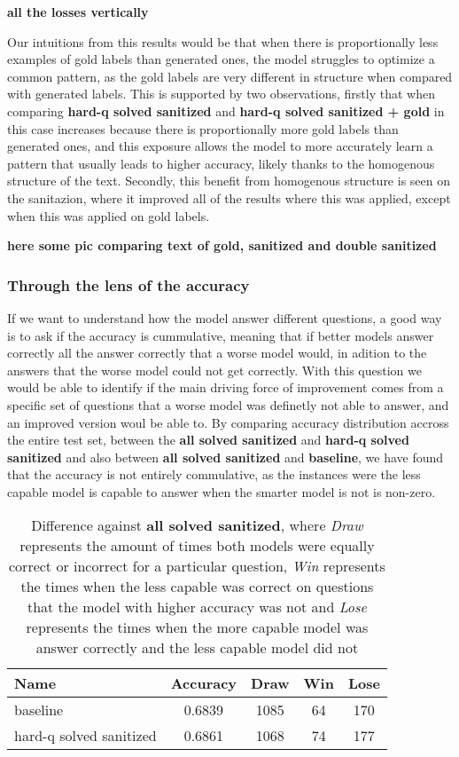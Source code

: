 \documentclass[a4paper,10pt]{article}
\begin{document}
\textbf{all the losses vertically}


Our intuitions from this results would be that when there is proportionally less examples of gold labels than generated ones, the model struggles to optimize a common pattern, as the gold labels are very different in structure when compared with generated labels. This is supported by two observations, firstly that when comparing \textbf{hard-q solved sanitized} and \textbf{hard-q solved sanitized + gold} in this case increases because there is proportionally more gold labels than generated ones, and this exposure allows the model to more accurately learn a pattern that usually leads to higher accuracy, likely thanks to the homogenous structure of the text. Secondly, this benefit from homogenous structure is seen on the sanitazion, where it improved all of the results where this was applied, except when this was applied on gold labels.

\textbf{here some pic comparing text of gold, sanitized and double sanitized}


\subsubsection{Through the lens of the accuracy}
If we want to understand how the model answer different questions, a good way is to ask if the accuracy is cummulative, meaning that if better models answer correctly all the answer correctly that a worse model would, in adition to the answers that the worse model could not get correctly. With this question we would be able to identify if the main driving force of improvement comes from a specific set of questions that a worse model was definetly not able to answer, and an improved version woul be able to. By comparing accuracy distribution accross the entire test set, between the \textbf{all solved sanitized} and \textbf{hard-q solved sanitized} and also between \textbf{all solved sanitized} and \textbf{baseline}, we have found that the accuracy is not entirely commulative, as the instances were the less capable model is capable to answer when the smarter model is not is non-zero. 
\begin{table}[ht]
\centering
 \begin{tabular}{lcccc}
 Name & Accuracy & Draw & Win & Lose\\
 \hline
 baseline & 0.6839 & 1085 & 64 & 170 \\
 hard-q solved sanitized & 0.6861 & 1068 & 74 & 177\\
 \end{tabular}
 \caption{Difference against \textbf{all solved sanitized}, where \textit{Draw} represents the amount of times both models were equally correct or incorrect for a particular question, \textit{Win} represents the times when the less capable was correct on questions that the model with higher accuracy was not and \textit{Lose} represents the times when the more capable model was answer correctly and the less capable model did not}
\end{table}
\end{document}
